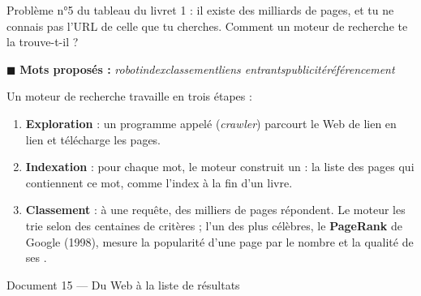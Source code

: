 \documentclass[11pt,a4paper]{article}
\newif\ifprof
\newcommand{\trou}[2][3cm]{\ifprof\textcolor{corr}{\underline{\textbf{\,#2\,}}}\else\underline{\hspace{#1}}\fi}
\newcommand{\motsproposes}[1]{\begin{mots}\small\textcolor{orangeT}{$\blacksquare$ \textbf{Mots proposés :}} \textit{#1}\end{mots}}
\begin{document}
Problème n°5 du tableau du livret 1 : il existe des milliards de pages, et tu ne connais pas l'URL de celle que tu cherches. Comment un moteur de recherche te la trouve-t-il ?

\motsproposes{robot\enspace\textbullet\enspace index\enspace\textbullet\enspace classement\enspace\textbullet\enspace liens entrants\enspace\textbullet\enspace publicité\enspace\textbullet\enspace référencement}

Un moteur de recherche travaille en trois étapes :
\begin{enumerate}
\item \textbf{Exploration} : un programme appelé \trou[2cm]{robot} (\emph{crawler}) parcourt le Web de lien en lien et télécharge les pages.
\item \textbf{Indexation} : pour chaque mot, le moteur construit un \trou[2cm]{index} : la liste des pages qui contiennent ce mot, comme l'index à la fin d'un livre.
\item \textbf{Classement} : à une requête, des milliers de pages répondent. Le moteur les trie selon des centaines de critères ; l'un des plus célèbres, le \textbf{PageRank} de Google (1998), mesure la popularité d'une page par le nombre et la qualité de ses \trou[3cm]{liens entrants}.
\end{enumerate}

\begin{docbox}{Document 15 — Du Web à la liste de résultats}
\begin{center}
\end{center}
\end{docbox}
\end{document}
